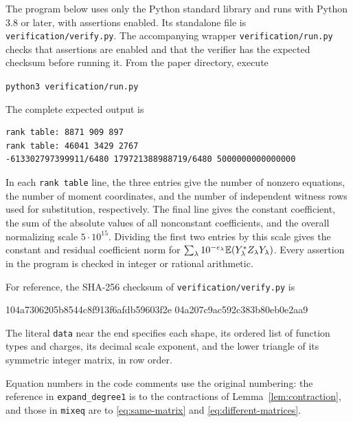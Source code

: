 \documentclass[11pt]{article}
\begin{document}
The program below uses only the Python standard library and runs with
Python 3.8 or later, with assertions enabled. Its standalone file is
\texttt{verification/verify.py}. The accompanying wrapper
\texttt{verification/run.py} checks that assertions are enabled and that
the verifier has the expected checksum before running it. From the
paper directory, execute
\begin{center}
\texttt{python3 verification/run.py}
\end{center}
The complete expected output is
\begin{lstlisting}[basicstyle=\small\ttfamily,columns=fullflexible,keepspaces=true]
rank table: 8871 909 897
rank table: 46041 3429 2767
-613302797399911/6480 179721388988719/6480 5000000000000000
\end{lstlisting}
In each \texttt{rank table} line, the three entries give the number of
nonzero equations, the number of moment coordinates, and the number of
independent witness rows used for substitution, respectively.
The final line gives the constant coefficient, the sum of
the absolute values of all nonconstant coefficients, and the overall
normalizing scale $5\cdot10^{15}$. Dividing the first two entries by
this scale gives the constant and residual coefficient norm for
$\sum_\lambda 10^{-e_\lambda}\mathbb E(Y_\lambda^*Z_\lambda Y_\lambda)$.
Every assertion in the program is checked in integer or rational arithmetic.

For reference, the SHA-256 checksum of \texttt{verification/verify.py} is
\begin{center}\footnotesize\ttfamily
104a7306205b8544c8f913f6afdb59603f2e\allowbreak
04a207c9ac592c383b80eb0e2aa9
\end{center}
The literal \texttt{data} near the end specifies each shape, its ordered
list of function types and charges, its decimal scale exponent, and the
lower triangle of its symmetric integer matrix, in row order.

Equation numbers in the code comments use the original numbering:
the reference in \texttt{expand\_degree1} is to the contractions of
Lemma~\ref{lem:contraction}, and those in \texttt{mixeq} are to
\eqref{eq:same-matrix} and \eqref{eq:different-matrices}.



\clearpage


\end{document}
